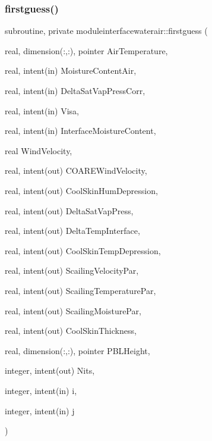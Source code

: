 \subsubsection{\texorpdfstring{firstguess()}{firstguess()}}
{\footnotesize\ttfamily subroutine, private moduleinterfacewaterair\+::firstguess (\begin{DoxyParamCaption}\item[{real, dimension(\+:,\+:), pointer}]{Air\+Temperature,  }\item[{real, intent(in)}]{Moisture\+Content\+Air,  }\item[{real, intent(in)}]{Delta\+Sat\+Vap\+Press\+Corr,  }\item[{real, intent(in)}]{Visa,  }\item[{real, intent(in)}]{Interface\+Moisture\+Content,  }\item[{real}]{Wind\+Velocity,  }\item[{real, intent(out)}]{C\+O\+A\+R\+E\+Wind\+Velocity,  }\item[{real, intent(out)}]{Cool\+Skin\+Hum\+Depression,  }\item[{real, intent(out)}]{Delta\+Sat\+Vap\+Press,  }\item[{real, intent(out)}]{Delta\+Temp\+Interface,  }\item[{real, intent(out)}]{Cool\+Skin\+Temp\+Depression,  }\item[{real, intent(out)}]{Scailing\+Velocity\+Par,  }\item[{real, intent(out)}]{Scailing\+Temperature\+Par,  }\item[{real, intent(out)}]{Scailing\+Moisture\+Par,  }\item[{real, intent(out)}]{Cool\+Skin\+Thickness,  }\item[{real, dimension(\+:,\+:), pointer}]{P\+B\+L\+Height,  }\item[{integer, intent(out)}]{Nits,  }\item[{integer, intent(in)}]{i,  }\item[{integer, intent(in)}]{j }\end{DoxyParamCaption})\hspace{0.3cm}{\ttfamily [private]}}

